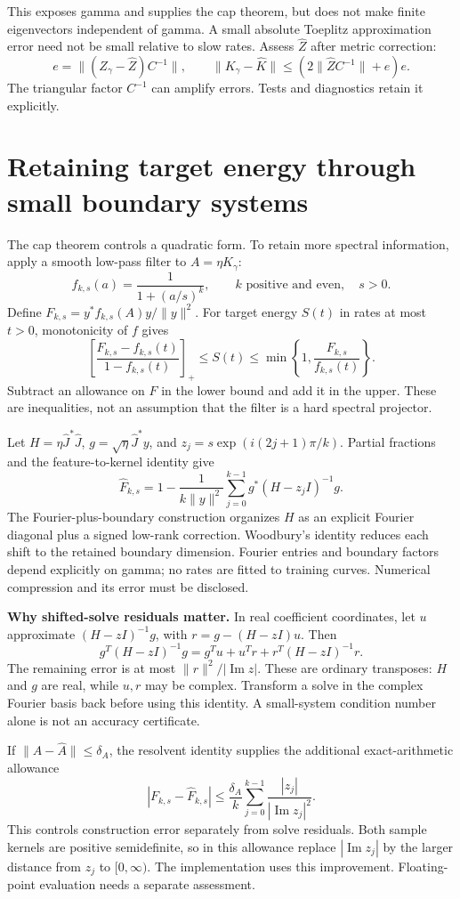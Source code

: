 \documentclass[11pt]{article}
\theoremstyle{definition}
\begin{document}
This exposes gamma and supplies the cap theorem, but does not make
finite eigenvectors independent of gamma. A small absolute Toeplitz
approximation error need not be small relative to slow rates. Assess
$\widehat Z$ after metric correction:
\[
e=\|(Z_\gamma-\widehat Z)C^{-1}\|,\qquad
\|K_\gamma-\widehat K\|\le(2\|\widehat ZC^{-1}\|+e)e.
\]
The triangular factor $C^{-1}$ can amplify errors. Tests and diagnostics
retain it explicitly.

\section{Retaining target energy through small boundary systems}
The cap theorem controls a quadratic form. To retain more spectral
information, apply a smooth low-pass filter to $A=\eta K_\gamma$:
\[
f_{k,s}(a)=\frac1{1+(a/s)^k},\qquad k\text{ positive and even},\quad s>0.
\]
Define $F_{k,s}=y^*f_{k,s}(A)y/\|y\|^2$. For target energy $S(t)$ in
rates at most $t>0$, monotonicity of $f$ gives
\[
\left[\frac{F_{k,s}-f_{k,s}(t)}{1-f_{k,s}(t)}\right]_+
\le S(t)\le\min\left\{1,\frac{F_{k,s}}{f_{k,s}(t)}\right\}.
\]
Subtract an allowance on $F$ in the lower bound and add it in the upper.
These are inequalities, not an assumption that the filter is a hard
spectral projector.

Let $H=\eta\widehat J^*\widehat J$, $g=\sqrt\eta\widehat J^*y$, and
$z_j=s\exp(i(2j+1)\pi/k)$. Partial fractions and the feature-to-kernel
identity give
\[
\widehat F_{k,s}=1-\frac1{k\|y\|^2}\sum_{j=0}^{k-1}
g^*(H-z_jI)^{-1}g.
\]
The Fourier-plus-boundary construction organizes $H$ as an explicit
Fourier diagonal plus a signed low-rank correction. Woodbury's identity
reduces each shift to the retained boundary dimension. Fourier entries
and boundary factors depend explicitly on gamma; no rates are fitted
to training curves. Numerical compression and its error must be disclosed.

\textbf{Why shifted-solve residuals matter.}
In real coefficient coordinates, let $u$ approximate $(H-zI)^{-1}g$,
with $r=g-(H-zI)u$. Then
\[
g^T(H-zI)^{-1}g=g^Tu+u^Tr+r^T(H-zI)^{-1}r.
\]
The remaining error is at most $\|r\|^2/|\operatorname{Im}z|$.
These are ordinary transposes: $H$ and $g$ are real, while $u,r$ may
be complex. Transform a solve in the complex Fourier basis back before
using this identity. A small-system condition number alone is not an
accuracy certificate.

If $\|A-\widehat A\|\le\delta_A$, the resolvent identity supplies
the additional exact-arithmetic allowance
\[
|F_{k,s}-\widehat F_{k,s}|\le
\frac{\delta_A}{k}\sum_{j=0}^{k-1}
\frac{|z_j|}{|\operatorname{Im}z_j|^2}.
\]
This controls construction error separately from solve residuals. Both
sample kernels are positive semidefinite, so in this allowance replace
$|\operatorname{Im}z_j|$ by the larger distance from $z_j$ to
$[0,\infty)$. The implementation uses this improvement. Floating-point
evaluation needs a separate assessment.
\end{document}
